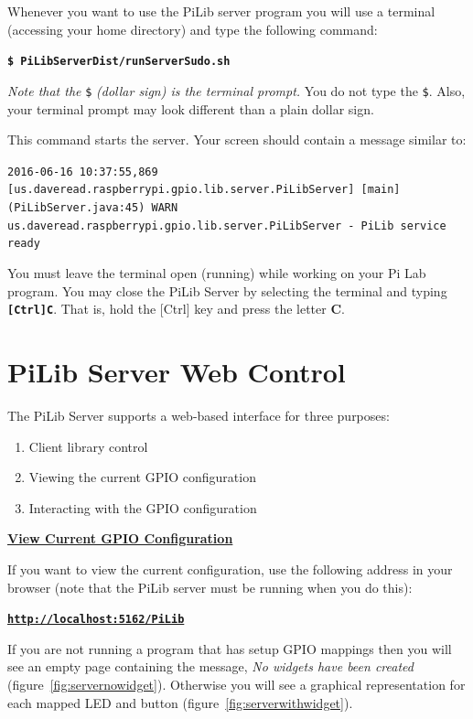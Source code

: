 
Whenever you want to use the PiLib server program you will use a terminal (accessing your home directory) and type the following command:

\textbf{\texttt{\$ PiLibServerDist/runServerSudo.sh}}

\textit{Note that the} \texttt{\$} \textit{(dollar sign) is the terminal prompt.} You do not type the \texttt{\$}. Also, your terminal prompt may look different than a plain dollar sign.

This command starts the server. Your screen should contain a message similar to:

\texttt{2016-06-16 10:37:55,869 [us.daveread.raspberrypi.gpio.lib.server.PiLibServer] [main] (PiLibServer.java:45) WARN  us.daveread.raspberrypi.gpio.lib.server.PiLibServer  - PiLib service ready}

You must leave the terminal open (running) while working on your Pi Lab program. You may close the PiLib Server by selecting the terminal and typing \textbf{\texttt{[Ctrl]C}}. That is, hold the [Ctrl] key and press the letter \textbf{C}.

\section{PiLib Server Web Control}

The PiLib Server supports a web-based interface for three purposes:

\begin{enumerate}
	\item Client library control
	\item Viewing the current GPIO configuration
	\item Interacting with the GPIO configuration
\end{enumerate}

\textbf{\underline{View Current GPIO Configuration}}

If you want to view the current configuration, use the following address in your browser (note that the PiLib server must be running when you do this):

\textbf{\texttt{\url{http://localhost:5162/PiLib}}}

If you are not running a program that has setup GPIO mappings then you will see an empty page containing the message, \textit{No widgets have been created} (figure~\ref{fig:servernowidget}). Otherwise you will see a graphical representation for each mapped LED and button (figure~\ref{fig:serverwithwidget}).

